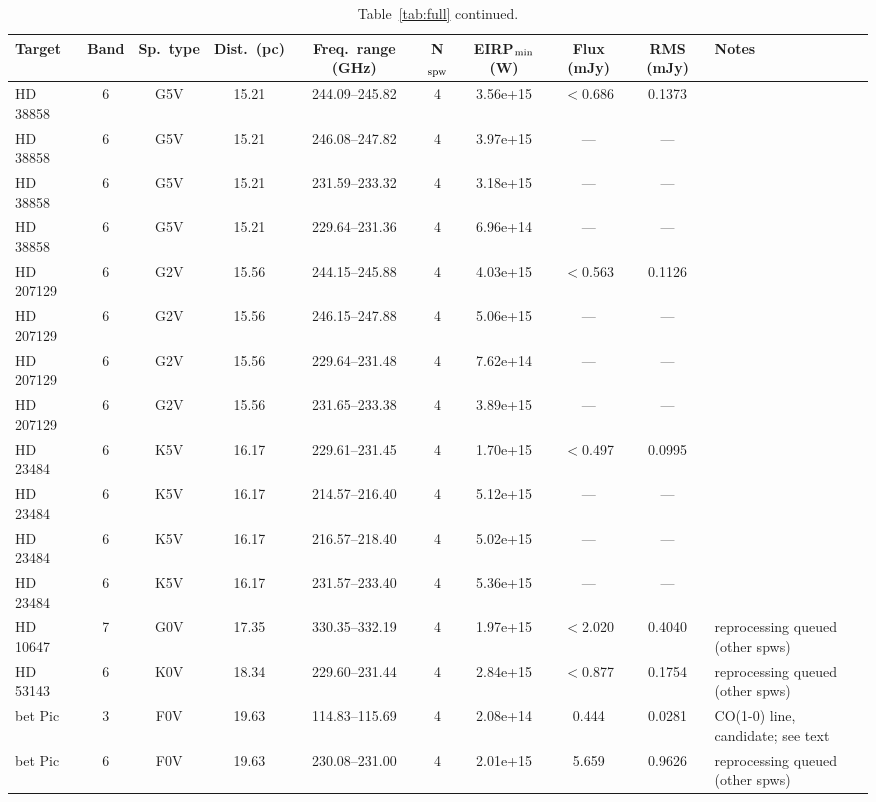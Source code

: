 \documentclass{openjournal}
\begin{document}
\begin{table}
\centering
\scriptsize
\caption{Table~\ref{tab:full} continued.}
\label{tab:full4}
\begin{tabularx}{\textwidth}{@{}l c c c c c c c c X@{}}
\hline
Target & Band & Sp.\ type & Dist.\ (pc) & Freq.\ range (GHz) & N$_{\rm spw}$ & EIRP$_{\rm min}$ (W) & Flux (mJy) & RMS (mJy) & Notes \\
\hline
HD 38858 & 6 & G5V & 15.21 & 244.09--245.82 & 4 & 3.56e+15 & $<$0.686 & 0.1373 &  \\
HD 38858 & 6 & G5V & 15.21 & 246.08--247.82 & 4 & 3.97e+15 & --- & --- &  \\
HD 38858 & 6 & G5V & 15.21 & 231.59--233.32 & 4 & 3.18e+15 & --- & --- &  \\
HD 38858 & 6 & G5V & 15.21 & 229.64--231.36 & 4 & 6.96e+14 & --- & --- &  \\
HD 207129 & 6 & G2V & 15.56 & 244.15--245.88 & 4 & 4.03e+15 & $<$0.563 & 0.1126 &  \\
HD 207129 & 6 & G2V & 15.56 & 246.15--247.88 & 4 & 5.06e+15 & --- & --- &  \\
HD 207129 & 6 & G2V & 15.56 & 229.64--231.48 & 4 & 7.62e+14 & --- & --- &  \\
HD 207129 & 6 & G2V & 15.56 & 231.65--233.38 & 4 & 3.89e+15 & --- & --- &  \\
HD 23484 & 6 & K5V & 16.17 & 229.61--231.45 & 4 & 1.70e+15 & $<$0.497 & 0.0995 &  \\
HD 23484 & 6 & K5V & 16.17 & 214.57--216.40 & 4 & 5.12e+15 & --- & --- &  \\
HD 23484 & 6 & K5V & 16.17 & 216.57--218.40 & 4 & 5.02e+15 & --- & --- &  \\
HD 23484 & 6 & K5V & 16.17 & 231.57--233.40 & 4 & 5.36e+15 & --- & --- &  \\
HD 10647 & 7 & G0V & 17.35 & 330.35--332.19 & 4 & 1.97e+15 & $<$2.020 & 0.4040 & reprocessing queued (other spws) \\
HD 53143 & 6 & K0V & 18.34 & 229.60--231.44 & 4 & 2.84e+15 & $<$0.877 & 0.1754 & reprocessing queued (other spws) \\
bet Pic & 3 & F0V & 19.63 & 114.83--115.69 & 4 & 2.08e+14 & 0.444 & 0.0281 & CO(1-0) line, candidate; see text \\
bet Pic & 6 & F0V & 19.63 & 230.08--231.00 & 4 & 2.01e+15 & 5.659 & 0.9626 & reprocessing queued (other spws) \\
\hline
\end{tabularx}
\end{table}
\end{document}
